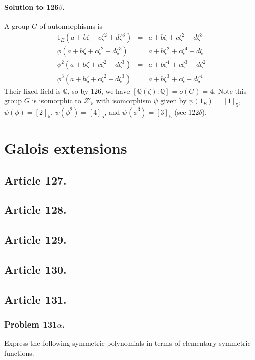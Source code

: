 \paragraph*{Solution to 126$\beta$.}
A group $G$ of automorphisms is
\begin{eqnarray}
1_E(a+b\zeta+c\zeta^2+d\zeta^3) &=& a+b\zeta+c\zeta^2+d\zeta^3 \nonumber \\
\phi(a+b\zeta+c\zeta^2+d\zeta^3) &=& a+b\zeta^2+c\zeta^4+d\zeta \nonumber \\
\phi^2(a+b\zeta+c\zeta^2+d\zeta^3) &=& a+b\zeta^4+c\zeta^3+d\zeta^2 \nonumber \\
\phi^3(a+b\zeta+c\zeta^2+d\zeta^3) &=& a+b\zeta^3+c\zeta+d\zeta^4 \nonumber
\end{eqnarray}
Their fixed field is $\mathbb{Q}$, so by 126, we have
$\left[\mathbb{Q}(\zeta):\mathbb{Q}\right] = o(G) = 4$. Note this group $G$ is
isomorphic to $Z'_5$ with isomorphism $\psi$ given by $\psi(1_E) = [1]_5$,
$\psi(\phi) = [2]_5$, $\psi(\phi^2) = [4]_5$, and $\psi(\phi^3) = [3]_5$
(see 122$\delta$).


\section{Galois extensions}


\subsection{Article 127.}

\subsection{Article 128.}

\subsection{Article 129.}

\subsection{Article 130.}

\subsection{Article 131.}

\subsubsection{Problem 131$\alpha$.}
Express the following symmetric polynomials in terms of elementary
symmetric functions.

